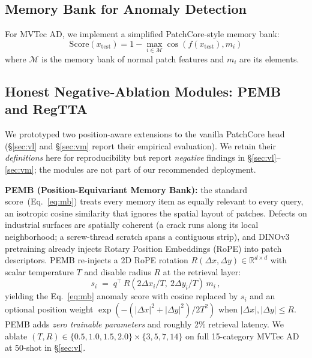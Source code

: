 \documentclass[journal]{IEEEtran}
\begin{document}
\subsection{Memory Bank for Anomaly Detection}
For MVTec AD, we implement a simplified PatchCore-style memory bank:
\begin{equation}
\mathrm{Score}(x_{\mathrm{test}}) = 1 - \max_{i \in \mathcal{M}} \cos\left( f(x_{\mathrm{test}}), m_i \right)
\label{eq:mb}
\end{equation}
where $\mathcal{M}$ is the memory bank of normal patch features and $m_i$ are its elements.

\subsection{Honest Negative-Ablation Modules: PEMB and RegTTA}
\label{sec:negative-ablation-modules}
We prototyped two position-aware extensions to the vanilla PatchCore head (\S\ref{sec:vl} and \S\ref{sec:vm} report their empirical evaluation). We retain their \emph{definitions} here for reproducibility but report \emph{negative} findings in \S\ref{sec:vl}--\ref{sec:vm}; the modules are not part of our recommended deployment.

\textbf{PEMB (Position-Equivariant Memory Bank):} the standard score~(Eq.~\ref{eq:mb}) treats every memory item as equally relevant to every query, an isotropic cosine similarity that ignores the spatial layout of patches. Defects on industrial surfaces are spatially coherent (a crack runs along its local neighborhood; a screw-thread scratch spans a contiguous strip), and DINOv3 pretraining already injects Rotary Position Embeddings (RoPE) into patch descriptors. PEMB re-injects a 2D RoPE rotation $R(\Delta x, \Delta y) \in \mathbb{R}^{d \times d}$ with scalar temperature $T$ and disable radius $R$ at the retrieval layer:
\begin{equation}
s_i \;=\; q^{\top} \, R\!\left(2\Delta x_i / T,\ 2\Delta y_i / T\right) \, m_i \,,
\label{eq:pemb}
\end{equation}
yielding the Eq.~\ref{eq:mb} anomaly score with cosine replaced by $s_i$ and an optional position weight $\exp(-(\lvert \Delta x\rvert^2 + \lvert \Delta y\rvert^2) / 2T^2)$ when $\lvert \Delta x \rvert, \lvert \Delta y \rvert \le R$. PEMB adds \emph{zero trainable parameters} and roughly 2\% retrieval latency. We ablate $(T, R) \in \{0.5, 1.0, 1.5, 2.0\} \times \{3, 5, 7, 14\}$ on full 15-category MVTec AD at 50-shot in \S\ref{sec:vl}.
\end{document}
